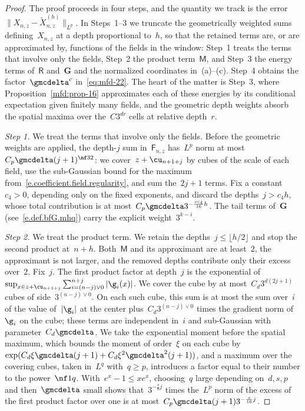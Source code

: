 \documentclass[11pt]{amsart}
\begin{document}
\begin{proof}
The proof proceeds in four steps, and the quantity we track is the error~$\|X_{n,z}-\widetilde X_{n,z}^{(h)}\|_{L^p}$. In Steps~1--3 we truncate the geometrically weighted sums defining~$X_{n,z}$ at a depth proportional to~$h$, so that the retained terms are, or are approximated by, functions of the fields in the window: Step~1 treats the terms that involve only the fields, Step~2 the product term~$\mathsf M$, and Step~3 the energy terms of~$\mathsf R$ and~$\mathbf G$ and the normalized coordinates in~(a)--(c). Step~4 obtains the factor~$\gmcdelta^c$ in~\eqref{eq:mfd-22}. The heart of the matter is Step~3, where Proposition~\ref{mfd:prop-16} approximates each of these energies by its conditional expectation given finitely many fields, and the geometric depth weights absorb the spatial maxima over the~$C3^{dr}$ cells at relative depth~$r$.

\smallskip

\emph{Step 1.} We treat the terms that involve only the fields. Before the geometric weights are applied, the depth-$j$ sum in~$\mathsf F_{n,z}$ has~$L^p$ norm at most~$C_p\gmcdelta(j+1)^{\nf32}$: we cover~$z+\cu_{n+1+j}$ by cubes of the scale of each field, use the sub-Gaussian bound for the maximum from~\eqref{e.coefficient.field.regularity}, and sum the~$2j+1$ terms. Fix a constant~$c_4>0$, depending only on the fixed exponents, and discard the depths~$j>c_4h$, whose total contribution is at most~$C_p\gmcdelta3^{-\frac{sc_4}{16}h}$. The tail terms of~$\mathbf G$ (see~\eqref{e.def.bfG.mhq}) carry the explicit weight~$3^{k-i}$.

\smallskip

\emph{Step 2.} We treat the product term. We retain the depths~$j\leq\lfloor h/2\rfloor$ and stop the second product at~$n+h$. Both~$\mathsf M$ and its approximant are at least~$2$, the approximant is not larger, and the removed depths contribute only their excess over~$2$. Fix~$j$. The first product factor at depth~$j$ is the exponential of~$\sup_{x\in z+\cu_{n+1+j}}\sum_{i=(n-j)\vee0}^{n+j}|\g_i(x)|$. We cover the cube by at most~$C_d3^{d(2j+1)}$ cubes of side~$3^{(n-j)\vee0}$. On each such cube, this sum is at most the sum over~$i$ of the value of~$|\g_i|$ at the center plus~$C_d3^{(n-j)\vee0}$ times the gradient norm of~$\g_i$ on the cube; these terms are independent in~$i$ and sub-Gaussian with parameter~$C_d\gmcdelta$. We take the exponential moment before the spatial maximum, which bounds the moment of order~$\xi$ on each cube by~$\exp(C_d\xi\gmcdelta(j+1)+C_d\xi^2\gmcdelta^2(j+1))$, and a maximum over the covering cubes, taken in~$L^q$ with~$q\geq p$, introduces a factor equal to their number to the power~$\nf1q$. With~$e^x-1\leq xe^x$, choosing~$q$ large depending on~$d,s,p$ and then~$\gmcdelta$ small shows that~$3^{-\frac{s}{8}j}$ times the~$L^p$ norm of the excess of the first product factor over one is at most~$C_p\gmcdelta(j+1)3^{-\frac{s}{16}j}$.


\end{proof}
\end{document}
